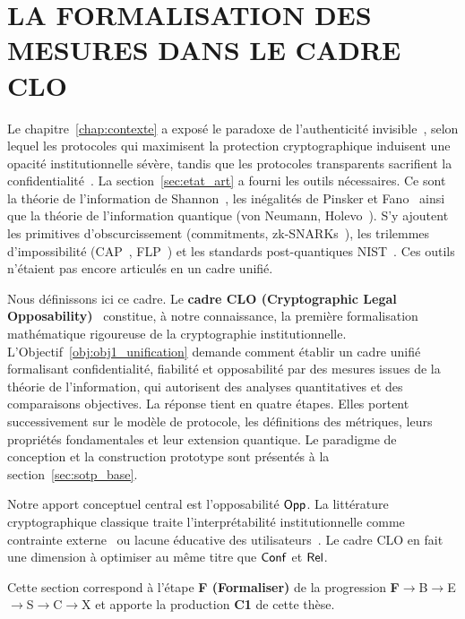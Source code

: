 
\section{LA FORMALISATION DES MESURES DANS LE CADRE CLO}
\label{sec:clo}
\begin{sloppypar}
Le chapitre~\ref{chap:contexte} a expos\'e le paradoxe de l'authenticit\'e
invisible~\cite{Goodman15,Casey16,Grimmelmann15}, selon lequel les protocoles qui maximisent la protection cryptographique
induisent une opacit\'e institutionnelle s\'ev\`ere, tandis que les protocoles
transparents sacrifient la confidentialit\'e~\cite{Bonneau16,Citron14}. La section~\ref{sec:etat_art}
a fourni les outils n\'ecessaires. Ce sont la th\'eorie de l'information de
Shannon~\cite{Shannon48,Shannon49,Wyner75}, les in\'egalit\'es de Pinsker et
Fano~\cite{Fano61,Pinsker1964} ainsi que la th\'eorie de l'information quantique
(von Neumann, Holevo~\cite{Holevo1973,NielsenChuang2010}). S'y ajoutent les primitives d'obscurcissement (commitments,
zk-SNARKs~\cite{Groth16,BCTV14,Gennaro13}), les trilemmes d'impossibilit\'e (CAP~\cite{Brewer00},
FLP~\cite{FLP85}) et les standards post-quantiques NIST~\cite{NISTPQC,Kyber2022,Dilithium2022}. Ces outils n'\'etaient pas encore articul\'es
en un cadre unifi\'e.

Nous d\'efinissons ici ce cadre. Le \textbf{cadre CLO (Cryptographic
Legal Opposability)}~\cite{MINKA2026CLO} constitue, \`a notre connaissance, la premi\`ere formalisation
math\'ematique rigoureuse de la cryptographie institutionnelle.
L'Objectif~\ref{obj:obj1_unification} demande comment \'etablir un cadre unifi\'e
formalisant confidentialit\'e, fiabilit\'e et opposabilit\'e par des mesures
issues de la th\'eorie de l'information, qui autorisent des analyses quantitatives et des
comparaisons objectives. La r\'eponse tient en quatre \'etapes. Elles portent successivement sur le
mod\`ele de protocole, les d\'efinitions des m\'etriques, leurs propri\'et\'es
fondamentales et leur extension quantique. Le paradigme de conception et la
construction prototype sont pr\'esent\'es \`a la section~\ref{sec:sotp_base}.

Notre apport conceptuel central est l'opposabilit\'e $\mathsf{Opp}$. La
litt\'erature cryptographique classique traite
l'interpr\'etabilit\'e institutionnelle comme contrainte externe~\cite{GMR85,Goldreich01,GoldwasserMicali84} ou lacune
\'educative des utilisateurs~\cite{Whitten99,Adams1999,Herley09}. Le cadre CLO en fait une dimension \`a
optimiser au m\^eme titre que $\mathsf{Conf}$ et $\mathsf{Rel}$.

Cette section correspond \`a l'\'etape \textbf{F (Formaliser)} de la progression \textbf{F}$\to$B$\to$E$\to$S$\to$C$\to$X et apporte la production \textbf{C1} de cette th\`ese.
\end{sloppypar}


